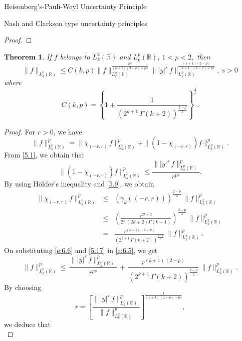 \documentclass[12pt,a4paper,reqno]{amsproc}
\newtheorem{theorem}{Theorem}[section]
\theoremstyle{definition}
\theoremstyle{remark}
\numberwithin{equation}{section}
\begin{document}
\begin{subsection}{Heisenberg's-Pauli-Weyl Uncertainty Principle}
\begin{subsection}{Nash and Clarkson type uncertainty principles}
\begin{proof}
\end{proof}
\begin{theorem} If   $f$ belongs to  $L^2_k(\mathbb{R})$ and $ L_k^p(\mathbb{R}) $, $1<p<2, $ then 
\begin{equation*}
 \|f\|_{L_k^p(\mathbb{R})}    \le C(k,p) \|f\|^{\frac{ps}{(k+1)(2-p)+ps}}_{L_k^2(\mathbb{R})} \||y|^s\, f\|^{\frac{(k+1)(2-p)}{(k+1)(2-p)+ps}}_{L_k^p(\mathbb{R})},~ s>0
\end{equation*}
where
\begin{equation*}
C(k,p) = \left\{ 1+\frac{1}{(2^{k+1}\,\Gamma(k+2))^{\frac{2-p}{2}}}\right\}^{\frac{1}{p}}.
\end{equation*}
\end{theorem}
\begin{proof}
 For $r>0$, we have
\begin{equation}\label{e:6.5}
\|f\|^p_{L_k^p(\mathbb{R})} = \|\chi_{(-r,r)}\, f\|^p_{L_k^p(\mathbb{R})}+\|(1-\chi_{(-r,r)})f\|^p_{L_k^p(\mathbb{R})}.
\end{equation}
From  \eqref{5.1}, we obtain that
\begin{equation}\label{e:6.6}
\|(1-\chi_{(-r,r)})f\|^p_{L_k^p(\mathbb{R})} \le \frac{\||y|^s\,f\|^p_{L_k^p(\mathbb{R})}}{r^{ps}}.   
\end{equation}
By using H{\"o}lder's inequality and \eqref{5.9}, we obtain    
\begin{eqnarray} \label{5.17}
\nonumber \|\chi_{(-r,r)}\, f\|^p_{L_k^p(\mathbb{R})} &\le& \left(\gamma_k((-r,r))\right)^{\frac{2-p}{2}} \, \|f\|^p_{L_k^2(\mathbb{R})}   \\
\nonumber &\le& \left(\frac{r^{2k+2}}{2^k\,(2k+2)\Gamma(k+1)}\right)^{\frac{2-p}{2}}\,\|f\|^p_{L_k^2(\mathbb{R})}\\
 &=& \frac{r^{(k+1)\,(2-p)}}{(2^{k+1}\,\Gamma(k+2))^{\frac{2-p}{2}}}\,\|f\|^p_{L_k^2(\mathbb{R})}.
\end{eqnarray}
On substituting   \eqref{e:6.6} and \eqref{5.17} in \eqref{e:6.5}, we get 
\begin{equation*}
\|f\|^p_{L_k^p(\mathbb{R})} \le \, \frac{\||y|^s\,f\|^p_{L_k^p(\mathbb{R})}}{r^{ps}}\,+\,\frac{r^{(k+1)\,(2-p)}}{(2^{k+1}\,\Gamma(k+2))^{\frac{2-p}{2}}}\,\|f\|^p_{L_k^2(\mathbb{R})}.
\end{equation*}
By choosing
\begin{equation*}
    r = \left[\frac{ \||y|^s\,f\|^p_{L_k^p(\mathbb{R})}}{ \|f\|^p_{L_k^2(\mathbb{R})}}\right]^{\frac{1}{(k+1)\,(2-p)+ps}},
\end{equation*}
 we deduce that 
\begin{equation*}

\end{equation*}
\end{proof}
\end{subsection}
\end{subsection}
\end{document}
